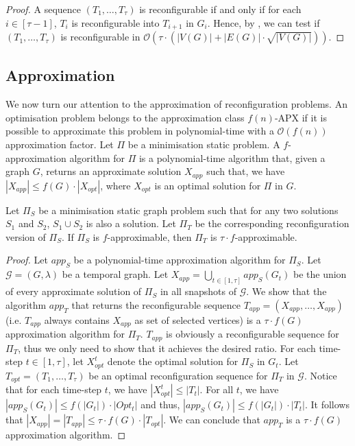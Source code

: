 \begin{proof}
A sequence $(T_1,\dots,T_\tau)$ is reconfigurable if and only if for each $i \in [\tau-1]$, $T_i$ is reconfigurable into $T_{i+1}$ in $G_i$. Hence, by , we can test if $(T_1,\dots,T_\tau)$ is reconfigurable in $\mathcal{O}(\tau \cdot (|V(G)|+|E(G)|\cdot\sqrt{|V(G)|}))$.
\end{proof}
 

\subsection{Approximation}

We now turn our attention to the approximation of reconfiguration problems. An optimisation problem belongs to the approximation class $f(n)$-APX if it is possible to approximate this problem in polynomial-time with a $\mathcal{O}(f(n))$ approximation factor. Let $\Pi$ be a minimisation static problem. A $f$-approximation algorithm for $\Pi$ is a polynomial-time algorithm that, given a graph $G$, returns an approximate solution $X_{app}$ such that, we have $|X_{app}|\leq f(G) \cdot |X_{opt}|$, where $X_{opt}$ is an optimal solution for $\Pi$ in $G$. 
 \begin{theoremrep}
   \label{th:approx}
Let $\Pi_S$ be a minimisation static graph problem such that for any two solutions $S_1$ and $S_2$, $S_1 \cup S_2$ is also a solution. Let $\Pi_T$ be the corresponding reconfiguration version of $\Pi_S$. If $\Pi_S$ is $f$-approximable, then $\Pi_T$ is $\tau\cdot f$-approximable.
\end{theoremrep}

\begin{proof}
  Let $app_S$ be a polynomial-time approximation algorithm for $\Pi_S$.
  Let $\mathcal{G}=(G,\lambda)$ be a temporal graph. Let $X_{app} = \bigcup\limits_{t\in [1,\tau]} app_S(G_t)$ be the union of every approximate solution of $\Pi_S$ in all snapshots of $\mathcal{G}$.
  We show that the algorithm $app_T$ that returns the reconfigurable sequence $T_{app} = (X_{app},\dots,X_{app})$ (i.e. $T_{app}$ always contains $X_{app}$ as set of selected vertices) is a $\tau \cdot f(G)$ approximation algorithm for $\Pi_T$.  
 $T_{app}$ is obviously a reconfigurable sequence for $\Pi_T$, thus we only need to show that it achieves the desired ratio.
  For each time-step $t \in [1,\tau]$, let $X^t_{opt}$ denote the optimal solution for $\Pi_S$ in $G_t$. Let $T_{opt}=(T_1,\dots,T_\tau)$ be an optimal reconfiguration sequence for $\Pi_T$ in $\mathcal{G}$. Notice that for each time-step $t$, we have $|X^t_{opt}| \leq |T_t|$.  For all $t$, we have $|app_S(G_t)| \leq f(|G_t|) \cdot |Opt_t|$ and thus, $|app_S(G_t)| \leq f(|G_t|) \cdot |T_t|$. It follows that $|X_{app}| = |T_{app}| \leq \tau \cdot f(G) \cdot |T_{opt}|$. We can conclude that $app_T$ is a $\tau\cdot f(G)$ approximation algorithm.
\end{proof}


